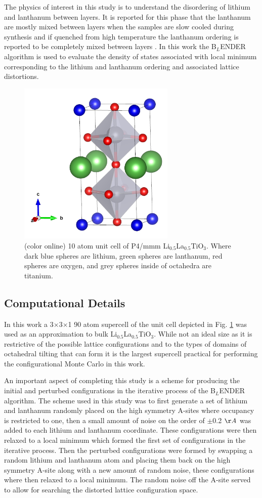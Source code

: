 \documentclass[aps,pre,reprint,superscriptaddress,showkeys]{revtex4-1}
\begin{document}
The physics of interest in this study is to understand the disordering of lithium and lanthanum between layers.  It is reported for this phase that the lanthanum are mostly mixed between layers when the samples are slow cooled during synthesis and if quenched from high temperature the lanthanum ordering is reported to be completely mixed between layers \cite{P4mmmstrucuture}. In this work the B$_L$ENDER algorithm is used to evaluate the density of states associated with local minimum corresponding to  the lithium and lanthanum ordering and associated lattice distortions.   
\begin{figure}[h!]
\includegraphics[width=7.5cm]{./figures/unit_cell_P4mmm_cropped.png}
\caption{(color online) 10 atom unit cell of P4/mmm Li$_{0.5}$La$_{0.5}$TiO$_{3}$. Where dark blue spheres are lithium, green spheres are lanthanum, red spheres are oxygen, and grey spheres inside of octahedra are titanium.\label{LLTO_unit_cell}}
\end{figure}
\subsection{Computational Details}
In this work a 3$\times$3$\times$1 90 atom supercell of the unit cell depicted in Fig. \ref{LLTO_unit_cell} was used as an approximation to bulk Li$_{0.5}$La$_{0.5}$TiO$_{3}$. While not an ideal size as it is  restrictive of the possible lattice configurations and to the types of domains of octahedral tilting that can form it is the largest supercell practical for performing the configurational Monte Carlo in this work. 

An important aspect of completing this study is a scheme for producing the initial and perturbed configurations in the iterative process of the B$_L$ENDER algorithm. The scheme used in this study was to first generate a set of lithium and lanthanum randomly placed on the high symmetry A-sites where occupancy is restricted to one, then a small amount of noise on the order of $\pm$0.2 $\AA$ was added to each lithium and lanthanum coordinate. These configurations were then relaxed to a local minimum which formed the first set of configurations in the iterative process.  Then the perturbed configurations  were formed by swapping a random lithium and lanthanum atom and placing them back on the high symmetry A-site along with a new amount of random noise, these configurations where then relaxed to a local minimum. The random noise off the A-site served to allow for searching the distorted lattice configuration space. 
\end{document}
